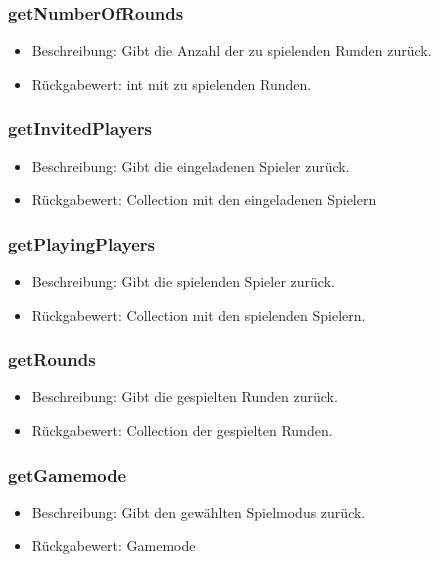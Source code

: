 \documentclass[a4paper]{scrreprt}
\begin{document}
    \subsubsection{getNumberOfRounds}
    \begin{itemize}
        \item Beschreibung: Gibt die Anzahl der zu spielenden Runden zurück.
        \item Rückgabewert: int mit zu spielenden Runden.
    \end{itemize}

    \subsubsection{getInvitedPlayers}
    \begin{itemize}
        \item Beschreibung: Gibt die eingeladenen Spieler zurück.
        \item Rückgabewert: Collection mit den eingeladenen Spielern
    \end{itemize}

    \subsubsection{getPlayingPlayers}
    \begin{itemize}
        \item Beschreibung: Gibt die spielenden Spieler zurück.
        \item Rückgabewert: Collection mit den spielenden Spielern.
    \end{itemize}

    \subsubsection{getRounds}
    \begin{itemize}
        \item Beschreibung: Gibt die gespielten Runden zurück.
        \item Rückgabewert: Collection der gespielten Runden.
    \end{itemize}

    \subsubsection{getGamemode}
    \begin{itemize}
        \item Beschreibung: Gibt den gewählten Spielmodus zurück.
        \item Rückgabewert: Gamemode
    \end{itemize}
\end{document}
